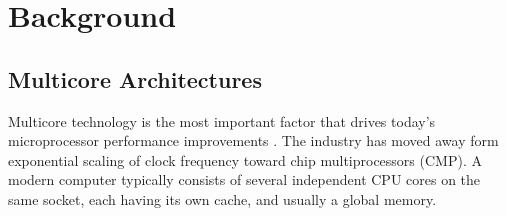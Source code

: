 \chapter{Background}





\section{Multicore Architectures}
\label{sec:multicore_architectures}
Multicore technology is the most important factor that drives today’s microprocessor performance improvements \cite{article6}. The industry has moved away form exponential scaling of clock frequency toward chip multiprocessors (CMP). A modern computer typically consists of several independent CPU cores on the same socket, each having its own cache, and usually a global memory.  

